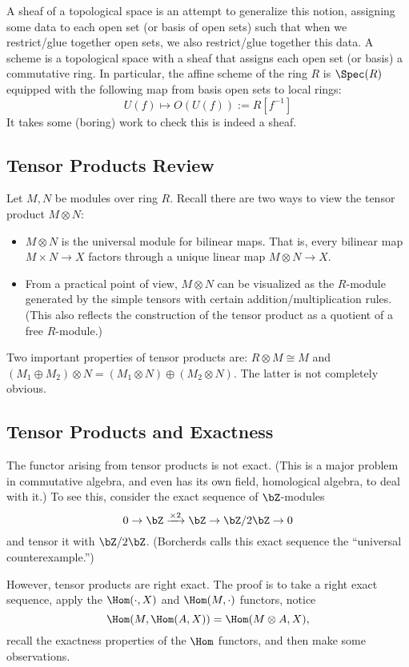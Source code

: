 A sheaf of a topological space is an attempt to generalize this notion, assigning some data to each open set (or basis of open sets) such that when we restrict/glue together open sets, we also restrict/glue together this data. A scheme is a topological space with a sheaf that assigns each open set (or basis) a commutative ring. In particular, the affine scheme of the ring $R$ is $\Spec(R)$ equipped with the following map from basis open sets to local rings:
\[
    U(f) \mapsto O(U(f)) := R[f^{-1}]
\]
It takes some (boring) work to check this is indeed a sheaf.

\subsection{Tensor Products Review}
Let $M, N$ be modules over ring $R$. Recall there are two ways to view the tensor product $M \otimes N$:
\begin{itemize}
    \item $M \otimes N$ is the universal module for bilinear maps. That is, every bilinear map $M \times N \to X$ factors through a unique linear map $M \otimes N \to X$.
    \item From a practical point of view, $M \otimes N$ can be visualized as the $R$-module generated by the simple tensors with certain addition/multiplication rules. (This also reflects the construction of the tensor product as a quotient of a free $R$-module.)
\end{itemize}
Two important properties of tensor products are: $R \otimes M \cong M$ and $(M_1 \oplus M_2) \otimes N = (M_1 \otimes N) \oplus (M_2 \otimes N)$. The latter is not completely obvious.

\subsection{Tensor Products and Exactness}
The functor arising from tensor products is not exact. (This is a major problem in commutative algebra, and even has its own field, homological algebra, to deal with it.) To see this, consider the exact sequence of $\bZ$-modules
\[
    0 \to \bZ \xrightarrow{\times 2} \bZ \to \bZ/2\bZ \to 0
\]
and tensor it with $\bZ/2\bZ$. (Borcherds calls this exact sequence the ``universal counterexample.'')

However, tensor products are right exact. The proof is to take a right exact sequence, apply the $\Hom(\cdot, X)$ and $\Hom(M, \cdot)$ functors, notice
\[
    \Hom(M, \Hom(A,X)) = \Hom(M \otimes A, X),
\]
recall the exactness properties of the $\Hom$ functors, and then make some observations.

